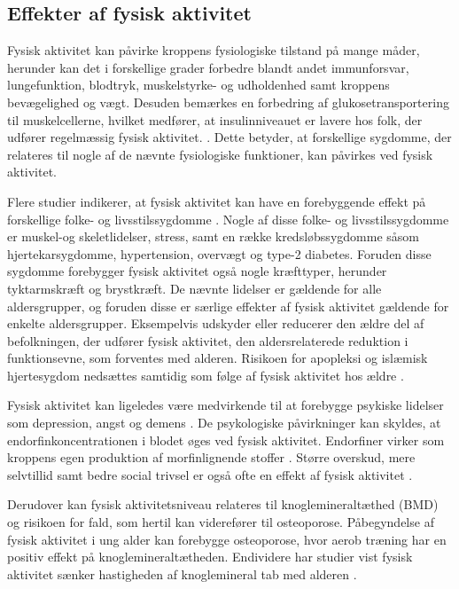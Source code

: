 \subsection{Effekter af fysisk aktivitet}\label{sec:effekterafaktivitet}
Fysisk aktivitet kan påvirke kroppens fysiologiske tilstand på mange måder, herunder kan det i forskellige grader forbedre blandt andet immunforsvar, lungefunktion, blodtryk, muskelstyrke- og udholdenhed samt kroppens bevægelighed og vægt. Desuden bemærkes en forbedring af glukosetransportering til muskelcellerne, hvilket medfører, at insulinniveauet er lavere hos folk, der udfører regelmæssig fysisk aktivitet. \citep{andersen2001, martini2015}. Dette betyder, at forskellige sygdomme, der relateres til nogle af de nævnte fysiologiske funktioner, kan påvirkes ved fysisk aktivitet.

Flere studier indikerer, at fysisk aktivitet kan have en forebyggende effekt på forskellige folke- og livsstilssygdomme \citep{warburton2010}. Nogle af disse folke- og livsstilssygdomme er muskel-og skeletlidelser, stress, samt en række kredsløbssygdomme såsom hjertekarsygdomme, hypertension, overvægt og type-2 diabetes. Foruden disse sygdomme forebygger fysisk aktivitet også nogle kræfttyper, herunder tyktarmskræft og brystkræft. De nævnte lidelser er gældende for alle aldersgrupper, og foruden disse er særlige effekter af fysisk aktivitet gældende for enkelte aldersgrupper. Eksempelvis udskyder eller reducerer den ældre del af befolkningen, der udfører fysisk aktivitet, den aldersrelaterede reduktion i funktionsevne, som forventes med alderen. Risikoen for apopleksi og islæmisk hjertesygdom nedsættes samtidig som følge af fysisk aktivitet hos ældre \citep{pedersen2011,
warburton2010}. 

Fysisk aktivitet kan ligeledes være medvirkende til at forebygge psykiske lidelser som depression, angst og demens \citep{pedersen2011}. De psykologiske påvirkninger kan skyldes, at endorfinkoncentrationen i blodet øges ved fysisk aktivitet. Endorfiner virker som kroppens egen produktion af morfinlignende stoffer \citep{kessing2016}. Større overskud, mere selvtillid samt bedre social trivsel er også ofte en effekt af fysisk aktivitet \citep{sundhedsstyrelsen2006}. 


Derudover kan fysisk aktivitetsniveau relateres til knoglemineraltæthed (BMD) og risikoen for fald, som hertil kan viderefører til osteoporose. Påbegyndelse af fysisk aktivitet i ung alder kan forebygge osteoporose, hvor aerob træning har en positiv effekt på knoglemineraltætheden. Endividere har studier vist fysisk aktivitet sænker hastigheden af knoglemineral tab med alderen \citep{sundhedsstyrelsen2006}. 



